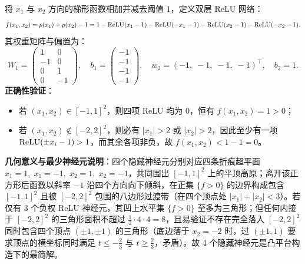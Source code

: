 将 $x_1$ 与 $x_2$ 方向的梯形函数相加并减去阈值 $1$，定义双层 ReLU 网络：
\[
  f(x_1, x_2) = p(x_1) + p(x_2) - 1
  = 1 - \operatorname{ReLU}(x_1 - 1) - \operatorname{ReLU}(-x_1 - 1) - \operatorname{ReLU}(x_2 - 1) - \operatorname{ReLU}(-x_2 - 1).
\]
其权重矩阵与偏置为：
\[
  W_1 = \begin{pmatrix} 1 & 0 \\ -1 & 0 \\ 0 & 1 \\ 0 & -1 \end{pmatrix}, \quad
  b_1 = \begin{pmatrix} -1 \\ -1 \\ -1 \\ -1 \end{pmatrix}, \quad
  w_2 = (-1,\; -1,\; -1,\; -1)^\top, \quad
  b_2 = 1.
\]
\textbf{正确性验证}：
\begin{itemize}
  \item 若 $(x_1, x_2) \in [-1, 1]^2$，则四项 ReLU 均为 $0$，恒有 $f(x_1, x_2) = 1 > 0$；
  \item 若 $(x_1, x_2) \notin [-2, 2]^2$，则必有 $|x_1| > 2$ 或 $|x_2| > 2$，因此至少有一项 $\operatorname{ReLU}(\pm x_i - 1) > 1$，而其余各项非负，故 $f(x_1, x_2) < 1 - 1 = 0$。
\end{itemize}
\textbf{几何意义与最少神经元说明}：四个隐藏神经元分别对应四条折痕超平面 $x_1 = 1,\; x_1 = -1,\; x_2 = 1,\; x_2 = -1$，共同围出 $[-1, 1]^2$ 上的平顶高原；离开该正方形后函数以斜率 $-1$ 沿四个方向向下倾斜，在正集 $\{f > 0\}$ 的边界构成包含 $[-1, 1]^2$ 且被 $[-2, 2]^2$ 包围的八边形过渡带（在四个顶点处 $|x_1|+|x_2| < 3$）。若仅有 $3$ 个负权 ReLU 神经元，其凹上水平集 $\{f > 0\}$ 至多为三角形；但任何内接于 $[-2, 2]^2$ 的三角形面积不超过 $\frac{1}{2}\cdot 4 \cdot 4 = 8$，且易验证不存在完全落入 $[-2, 2]^2$ 同时包含四个顶点 $(\pm 1, \pm 1)$ 的三角形（底边落于 $x_2=-2$ 时，过 $(\pm 1, 1)$ 要求顶点的横坐标同时满足 $t \le -\frac{2}{3}$ 与 $t \ge \frac{2}{3}$，矛盾）。故 4 个隐藏神经元是凸平台构造下的最简解。

